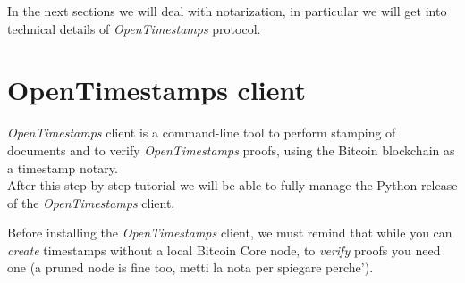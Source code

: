 \bigskip
\noindent
In the next sections we will deal with notarization, in particular we will get into technical details of \textit{OpenTimestamps} protocol.

\bigskip
\section{OpenTimestamps client}
\textit{OpenTimestamps} client is a command-line tool to perform stamping of documents and to verify \textit{OpenTimestamps} proofs, using the Bitcoin blockchain as a timestamp notary. \\
After this step-by-step tutorial we will be able to fully manage the Python release of the \textit{OpenTimestamps} client.

\bigskip
\noindent
Before installing the \textit{OpenTimestamps} client, we must remind that while you can \textit{create} timestamps without a local Bitcoin Core node, to \textit{verify} proofs you need one (a pruned node is fine too, metti la nota per spiegare perche').

